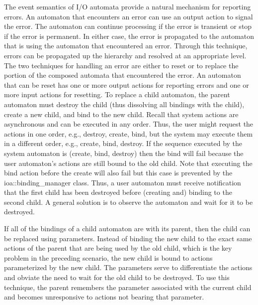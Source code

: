 The event semantics of I/O automata provide a natural mechanism for reporting errors.
An automaton that encounters an error can use an output action to signal the error.
The automaton can continue processing if the error is transient or stop if the error is permanent.
In either case, the error is propagated to the automaton that is using the automaton that encountered an error.
Through this technique, errors can be propagated up the hierarchy and resolved at an appropriate level.
The two techniques for handling an error are either to reset or to replace the portion of the composed automata that encountered the error.
An automaton that can be reset has one or more output actions for reporting errors and one or more input actions for resetting.
To replace a child automaton, the parent automaton must destroy the child (thus dissolving all bindings with the child), create a new child, and bind to the new child.
Recall that system actions are asynchronous and can be executed in any order.
Thus, the user might request the actions in one order, e.g., destroy, create, bind, but the system may execute them in a different order, e.g., create, bind, destroy.
If the sequence executed by the system automaton is (create, bind, destroy) then the bind will fail because the user automaton's actions are still bound to the old child.
Note that executing the bind action before the create will also fail but this case is prevented by the ioa::binding\_manager class.
Thus, a user automaton must receive notification that the first child has been destroyed before (creating and) binding to the second child.
A general solution is to observe the automaton and wait for it to be destroyed.

If all of the bindings of a child automaton are with its parent, then the child can be replaced using parameters.
Instead of binding the new child to the exact same actions of the parent that are being used by the old child, which is the key problem in the preceding scenario, the new child is bound to actions parameterized by the new child.
The parameters serve to differentiate the actions and obviate the need to wait for the old child to be destroyed.
To use this technique, the parent remembers the parameter associated with the current child and becomes unresponsive to actions not bearing that parameter.
